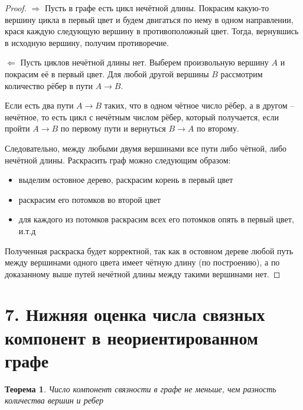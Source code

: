 \documentclass[a4paper,12pt]{article}
\newtheorem*{ther}{Теорема}
\begin{document}
    \begin{proof}
        \par $\Rightarrow$
        Пусть в графе есть цикл нечётной длины. Покрасим какую-то вершину цикла
        в первый цвет и будем двигаться по нему в одном направлении, крася
        каждую следующую вершину в противоположный цвет. Тогда, вернувшись в
        исходную вершину, получим противоречие.
        \par $\Leftarrow$
        Пусть циклов нечётной длины нет. Выберем произвольную вершину $A$ и
        покрасим её в первый цвет. Для любой другой вершины $B$ рассмотрим
        количество рёбер в пути $A\rightarrow B$.
        \par Если есть два пути $A\rightarrow B$ таких, что в одном чётное число
        рёбер, а в другом -- нечётное, то есть цикл с нечётным числом рёбер,
        который получается, если пройти $A\rightarrow B$ по первому пути и
        вернуться $B \rightarrow A$ по второму.
        \par Следовательно, между любыми двумя вершинами все пути либо чётной,
        либо нечётной длины. Раскрасить граф можно следующим образом:
        \begin{itemize}
            \item выделим остовное дерево, раскрасим корень в первый цвет
            \item раскрасим его потомков во второй цвет
            \item для каждого из потомков раскрасим всех его потомков опять в
                первый цвет, и.т.д
        \end{itemize}
        Полученная раскраска будет корректной, так как в остовном дереве
        любой путь между вершинами одного цвета имеет чётную длину (по
        построению), а по доказанному выше путей нечётной длины между такими
        вершинами нет.
    \end{proof}

	\section*{7. Нижняя оценка числа связных компонент в неориентированном графе}

	\begin{ther}
		Число компонент связности в графе не меньше, чем разность количества вершин и ребер
	\end{ther}
\end{document}
